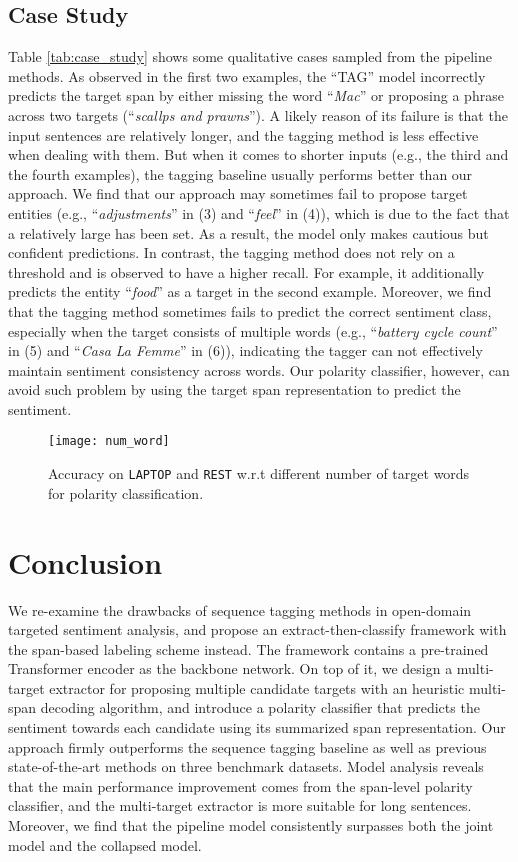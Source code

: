 \documentclass[11pt,a4paper]{article}
\begin{document}
\subsection{Case Study}
Table \ref{tab:case_study} shows some qualitative cases sampled from the pipeline methods.
As observed in the first two examples, the ``TAG'' model incorrectly predicts the target span by either missing the word ``\emph{Mac}'' or proposing a phrase across two targets (``\emph{scallps and prawns}'').
A likely reason of its failure is that the input sentences are relatively longer, and the tagging method is less effective when dealing with them.
But when it comes to shorter inputs (e.g., the third and the fourth examples), the tagging baseline usually performs better than our approach.
We find that our approach may sometimes fail to propose target entities (e.g., ``\emph{adjustments}'' in (3) and ``\emph{feel}'' in (4)), which is due to the fact that a relatively large  has been set.
As a result, the model only makes cautious but confident predictions.
In contrast, the tagging method does not rely on a threshold and is observed to have a higher recall.
For example, it additionally predicts the entity ``\emph{food}'' as a target in the second example.
Moreover, we find that the tagging method sometimes fails to predict the correct sentiment class, especially when the target consists of multiple words (e.g., ``\emph{battery cycle count}'' in (5) and ``\emph{Casa La Femme}'' in (6)), indicating the tagger can not effectively maintain sentiment consistency across words.
Our polarity classifier, however, can avoid such problem by using the target span representation to predict the sentiment.

\begin{figure}
\center
\texttt{[image: num\_word]}
\caption{Accuracy on \texttt{LAPTOP} and \texttt{REST} w.r.t different number of target words for polarity classification.}
\label{fig:num_word}
\end{figure} \section{Conclusion}
We re-examine the drawbacks of sequence tagging methods in open-domain targeted sentiment analysis, and propose an extract-then-classify framework with the span-based labeling scheme instead.
The framework contains a pre-trained Transformer encoder as the backbone network.
On top of it, we design a multi-target extractor for proposing multiple candidate targets with an heuristic multi-span decoding algorithm, and introduce a polarity classifier that predicts the sentiment towards each candidate using its summarized span representation.
Our approach firmly outperforms the sequence tagging baseline as well as previous state-of-the-art methods on three benchmark datasets.
Model analysis reveals that the main performance improvement comes from the span-level polarity classifier, and the multi-target extractor is more suitable for long sentences.
Moreover, we find that the pipeline model consistently surpasses both the joint model and the collapsed model.
\end{document}
